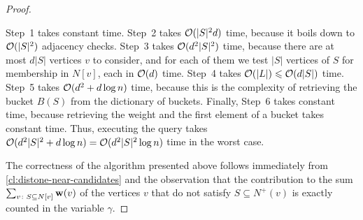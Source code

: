 \begin{proof}
\begin{enumerate}
\end{enumerate}
Step~1 takes constant time. Step~2 takes $\mathcal{O}(|S|^2 d)$ time, because it boils down to $\mathcal{O}(|S|^2)$ adjacency checks. Step~3 takes $\mathcal{O}(d^2|S|^2)$ time, because there are at most $d|S|$ vertices $v$ to consider, and for each of them we test $|S|$ vertices of $S$ for membership in $N[v]$, each in $\mathcal{O}(d)$ time. Step~4 takes $\mathcal{O}(|L|)\leqslant \mathcal{O}(d|S|)$ time.
Step~5 takes $\mathcal{O}(d^2+d\log n)$ time, because this is the complexity of retrieving the bucket $B(S)$ from the dictionary of buckets. Finally, Step~6 takes constant time, because retrieving the weight and the first element of a bucket takes constant time. Thus, executing the query takes $\mathcal{O}(d^2|S|^2 + d\log n) = \mathcal{O}(d^2 |S|^2 \log n)$ time in the worst case.

The correctness of the algorithm presented above follows immediately from \cref{cl:distone-near-candidates} and the observation that the contribution to the sum $\sum_{v\colon S\subseteq N[v]} \mathbf{w}(v)$ of the vertices $v$ that do not satisfy $S\subseteq N^+(v)$ is exactly counted in the variable $\gamma$.
\end{proof}

